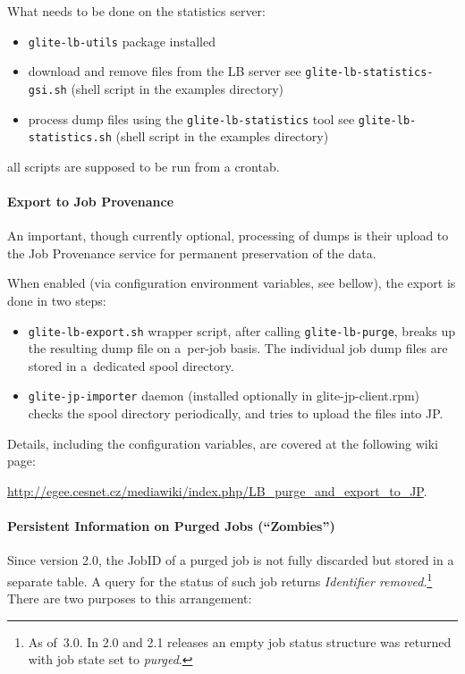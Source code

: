 What needs to be done on the statistics server:
\begin{itemize}
\item \verb'glite-lb-utils' package installed
\item download and remove files from the LB server
see \verb'glite-lb-statistics-gsi.sh' (shell script in the examples directory)
\item process dump files using the \verb'glite-lb-statistics' tool
see \verb'glite-lb-statistics.sh' (shell script in the examples directory)
\end{itemize}
all scripts are supposed to be run from a crontab.


\paragraph{Export to Job Provenance}

An important, though currently optional, processing of \LB dumps
is their upload to the Job Provenance service for permanent preservation
of the data.


When enabled (via configuration environment variables, see bellow), 
the export is done in two steps:
\begin{itemize}
\item \verb'glite-lb-export.sh' wrapper script, after calling \verb'glite-lb-purge', breaks up the resulting dump file on a~per-job basis.
The individual job dump files are stored in a~dedicated spool directory.
\item \verb'glite-jp-importer' daemon (installed optionally in glite-jp-client.rpm) checks the spool directory periodically,
and tries to upload the files into JP.
\end{itemize}

Details, including the configuration variables, are covered at the following
wiki page:

\url{http://egee.cesnet.cz/mediawiki/index.php/LB_purge_and_export_to_JP}.

\paragraph{Persistent Information on Purged Jobs (``Zombies'')}

Since \LB version 2.0, the JobID of a purged job is not fully discarded but stored in a separate table. A query for the status of such job returns \emph{Identifier removed}.\footnote{As of \LB\,3.0. In 2.0 and 2.1 releases an empty job status structure was returned with job state set to \emph{purged}.} There are two purposes to this arrangement:

